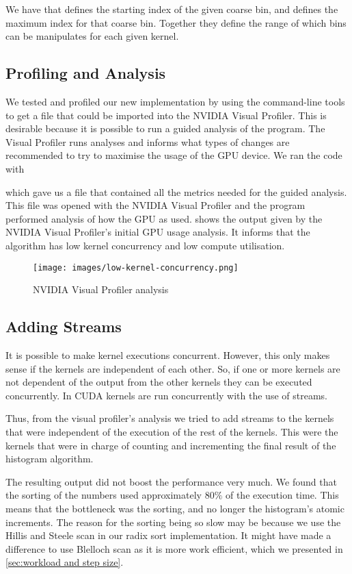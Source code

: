 We have that  defines the starting index of the given coarse bin, and  defines the maximum index for that coarse bin.
Together they define the range of which bins can be manipulates for each given kernel.

\subsection{Profiling and Analysis}

We tested and profiled our new implementation by using the  command-line tools to get a file that could be imported into the NVIDIA Visual Profiler.
This is desirable because it is possible to run a guided analysis of the program.
The Visual Profiler runs analyses and informs what types of changes are recommended to try to maximise the usage of the GPU device.
We ran the code with

\begin{quote}
\end{quote}

which gave us a file that contained all the metrics needed for the guided analysis.
This file was opened with the NVIDIA Visual Profiler and the program performed analysis of how the GPU as used.
 shows the output given by the NVIDIA Visual Profiler's initial GPU usage analysis.
It informs that the algorithm has low kernel concurrency and low compute utilisation.

\begin{figure}[htb]
  \centering
  \texttt{[image: images/low-kernel-concurrency.png]}
  \caption{NVIDIA Visual Profiler analysis}
  \label{fig:first impl}
\end{figure}

\subsection{Adding Streams}

It is possible to make kernel executions concurrent.
However, this only makes sense if the kernels are independent of each other.
So, if one or more kernels are not dependent of the output from the other kernels they can be executed concurrently.
In CUDA kernels are run concurrently with the use of streams.

Thus, from the visual profiler's analysis we tried to add streams to the kernels that were independent of the execution of the rest of the kernels.
This were the kernels that were in charge of counting and incrementing the final result of the histogram algorithm.


The resulting output did not boost the performance very much.
We found that the sorting of the numbers used approximately $80\%$ of the execution time.
This means that the bottleneck was the sorting, and no longer the histogram's atomic increments.
The reason for the sorting being so slow may be because we use the Hillis and Steele scan in our radix sort implementation.
It might have made a difference to use Blelloch scan as it is more work efficient, which we presented in \cref{sec:workload and step size}.
